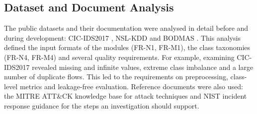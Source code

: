 \subsection{Dataset and Document Analysis}

The public datasets and their documentation were analysed in detail before and during development: CIC-IDS2017 \cite{sharafaldin2018cicids,cicids2017web}, NSL-KDD \cite{tavallaee2009nslkdd} and BODMAS \cite{yang2021bodmas}. This analysis defined the input formats of the modules (FR-N1, FR-M1), the class taxonomies (FR-N4, FR-M4) and several quality requirements. For example, examining CIC-IDS2017 revealed missing and infinite values, extreme class imbalance and a large number of duplicate flows. This led to the requirements on preprocessing, class-level metrics and leakage-free evaluation. Reference documents were also used: the MITRE ATT\&CK knowledge base for attack techniques \cite{strom2018attack} and NIST incident response guidance \cite{nist80061r3} for the steps an investigation should support.
